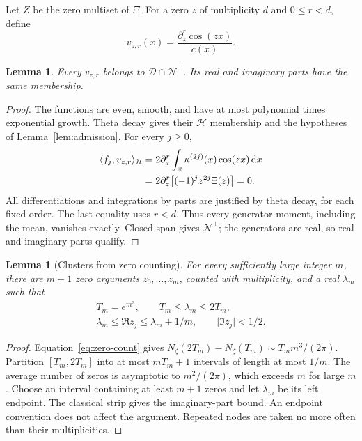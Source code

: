 \documentclass[11pt,a4paper]{article}
\newcommand{\R}{\mathbb R}
\newcommand{\HH}{\mathcal H}
\newcommand{\DD}{\mathcal D}
\newcommand{\NN}{\mathcal N}
\newcommand{\ip}[2]{\langle #1,#2\rangle}
\newcommand{\abs}[1]{\lvert #1\rvert}
\newcommand{\dd}{\,\mathrm d}
\newtheorem{lemma}[theorem]{Lemma}
\theoremstyle{definition}
\theoremstyle{remark}
\numberwithin{equation}{section}
\begin{document}
Let $Z$ be the zero multiset of $\Xi$. For a zero $z$ of multiplicity $d$
and $0\le r<d$, define
\begin{equation}\label{eq:root-mode}
 v_{z,r}(x)=\frac{\partial_z^r\cos(zx)}{c(x)}.
\end{equation}
\begin{lemma}\label{lem:root-modes}
Every $v_{z,r}$ belongs to $\DD\cap\NN^\perp$. Its real and imaginary
parts have the same membership.
\end{lemma}
\begin{proof}
The functions are even, smooth, and have at most polynomial times
exponential growth. Theta decay gives their $\HH$ membership and the
hypotheses of Lemma~\ref{lem:admission}. For every $j\ge0$,
\begin{align}\label{eq:all-moments}
 \ip{f_j}{v_{z,r}}_{\HH}
 &=2\partial_z^r\int_\R\kappa^{(2j)}(x)\cos(zx)\dd x\notag\\
 &=2\partial_z^r\bigl[(-1)^jz^{2j}\Xi(z)\bigr]=0.
\end{align}
All differentiations and integrations by parts are justified by theta
decay, for each fixed order. The last equality uses $r<d$. Thus every
generator moment, including the mean, vanishes exactly. Closed span gives
$\NN^\perp$; the generators are real, so real and imaginary parts qualify.
\end{proof}

\begin{lemma}[Clusters from zero counting]\label{lem:clusters}
For every sufficiently large integer $m$, there are $m+1$ zero arguments
$z_0,\ldots,z_m$, counted with multiplicity, and a real $\lambda_m$ such
that
\begin{equation}\label{eq:cluster}
 \begin{gathered}
 T_m=e^{m^3},\qquad T_m\le\lambda_m\le2T_m,\\
 \lambda_m\le\Re z_j\le\lambda_m+1/m,
 \qquad \abs{\Im z_j}<1/2.
 \end{gathered}
\end{equation}
\end{lemma}
\begin{proof}
Equation~\eqref{eq:zero-count} gives
$N_\zeta(2T_m)-N_\zeta(T_m)\sim T_m m^3/(2\pi)$.
Partition $[T_m,2T_m]$ into at most $mT_m+1$ intervals of length at most
$1/m$. The average number of zeros is asymptotic to $m^2/(2\pi)$,
which exceeds $m$ for large $m$. Choose an interval containing at least
$m+1$ zeros and let $\lambda_m$ be its left endpoint. The classical strip
gives the imaginary-part bound. An endpoint convention does not affect the
argument. Repeated nodes are taken no more often than their multiplicities.
\end{proof}
\end{document}
